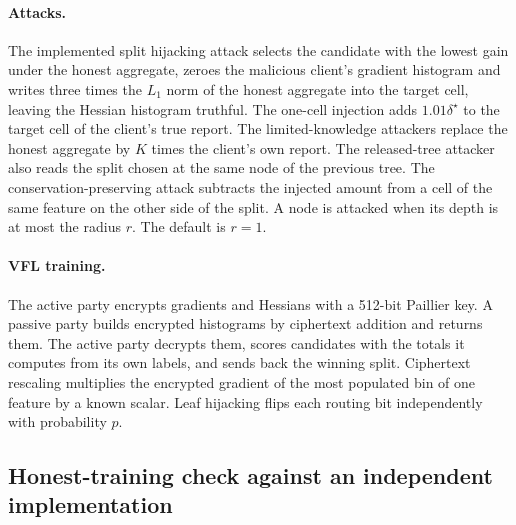 \documentclass[11pt]{article}
\newcommand{\rev}[1]{#1}
\begin{document}
\rev{\paragraph{Attacks.} The implemented split hijacking attack selects the candidate with the lowest gain under the honest aggregate, zeroes the malicious client's gradient histogram and writes three times the $L_1$ norm of the honest aggregate into the target cell, leaving the Hessian histogram truthful. The one-cell injection adds $1.01\delta^\star$ to the target cell of the client's true report. The limited-knowledge attackers replace the honest aggregate by $K$ times the client's own report. The released-tree attacker also reads the split chosen at the same node of the previous tree. The conservation-preserving attack subtracts the injected amount from a cell of the same feature on the other side of the split. A node is attacked when its depth is at most the radius $r$. The default is $r=1$.}

\rev{\paragraph{VFL training.} The active party encrypts gradients and Hessians with a 512-bit Paillier key. A passive party builds encrypted histograms by ciphertext addition and returns them. The active party decrypts them, scores candidates with the totals it computes from its own labels, and sends back the winning split. Ciphertext rescaling multiplies the encrypted gradient of the most populated bin of one feature by a known scalar. Leaf hijacking flips each routing bit independently with probability $p$.}

\subsection{\rev{Honest-training check against an independent implementation}}
\label{sec:xgbcheck}
\end{document}
